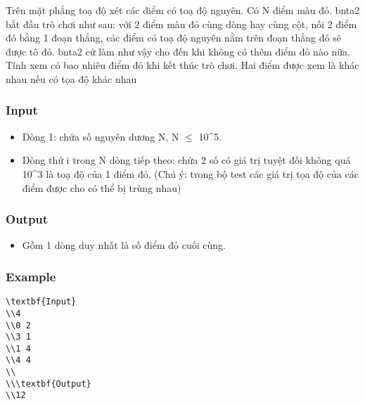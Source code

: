 



   Trên mặt phẳng toạ độ xét các điểm có toạ độ nguyên. Có N điểm màu đỏ. bnta2 bắt đầu trò chơi như sau: với 2 điểm màu đỏ cùng dòng hay cùng cột, nối 2 điểm đó bằng 1 đoạn thẳng, các điểm có toạ độ nguyên nằm trên đoạn thẳng đó sẽ được tô đỏ. bnta2 cứ làm như vậy cho đến khi không có thêm điểm đỏ nào nữa.   Tính xem có bao nhiêu điểm đỏ khi kết thúc trò chơi. Hai điểm được xem là khác nhau nếu có tọa độ khác nhau  

\subsubsection{   Input  }
\begin{itemize}
	\item     Dòng 1: chứa số nguyên dương N, N $\le$ 10\textasciicircum5.   
	\item     Dòng thứ i trong N dòng tiếp theo: chứa 2 số có giá trị tuyệt đối không quá 10\textasciicircum3 là toạ độ của 1 điểm đỏ. (Chú ý: trong bộ test các giá trị tọa độ của các điểm được cho có thể bị trùng nhau)   
\end{itemize}

\subsubsection{   Output  }
\begin{itemize}
	\item     Gồm 1 dòng duy nhất là số điểm đỏ cuối cùng.   
\end{itemize}

\subsubsection{   Example  }
\begin{verbatim}
\textbf{Input}
\\4 
\\0 2 
\\3 1 
\\1 4 
\\4 4 
\\
\\\textbf{Output}
\\12\end{verbatim}

